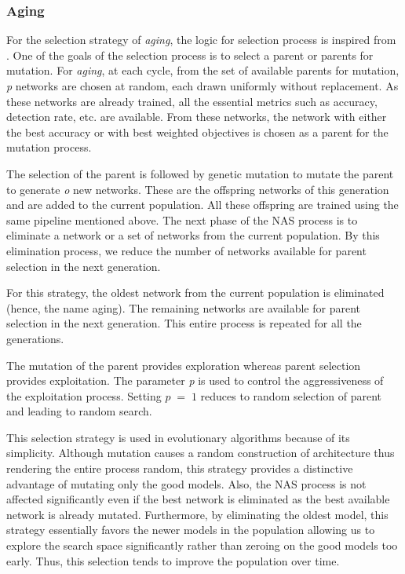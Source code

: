 \subsubsection{Aging}

For the selection strategy of \textit{aging}, the logic for selection process is inspired from \cite{real2019regularized}. One of the goals of the selection process is to select a parent or parents for mutation. For \textit{aging}, at each cycle, from the set of available parents for mutation, \textit{p} networks are chosen at random, each drawn uniformly without replacement. As these networks are already trained, all the essential metrics such as accuracy, detection rate, etc. are available. From these networks, the network with either the best accuracy or with best weighted objectives is chosen as a parent for the mutation process.

The selection of the parent is followed by genetic mutation to mutate the parent to generate \textit{o} new networks. These are the offspring networks of this generation and are added to the current population. All these offspring are trained using the same pipeline mentioned above. The next phase of the NAS process is to eliminate a network or a set of networks from the current population. By this elimination process, we reduce the number of networks available for parent selection in the next generation.

For this strategy, the oldest network from the current population is eliminated (hence, the name aging). The remaining networks are available for parent selection in the next generation. This entire process is repeated for all the generations. 

The mutation of the parent provides exploration whereas parent selection provides exploitation. The parameter \textit{p} is used to control the aggressiveness of the exploitation process. Setting $\textit{p} \; = \; 1 $ reduces to random selection of parent and leading to random search. 

This selection strategy is used in evolutionary algorithms because of its simplicity. Although mutation causes a random construction of architecture thus rendering the entire process random, this strategy provides a distinctive advantage of mutating only the good models. Also, the NAS process is not affected significantly even if the best network is eliminated as the best available network is already mutated. Furthermore, by eliminating the oldest model, this strategy essentially favors the newer models in the population allowing us to explore the search space significantly rather than zeroing on the good models too early. Thus, this selection tends to improve the population over time.

